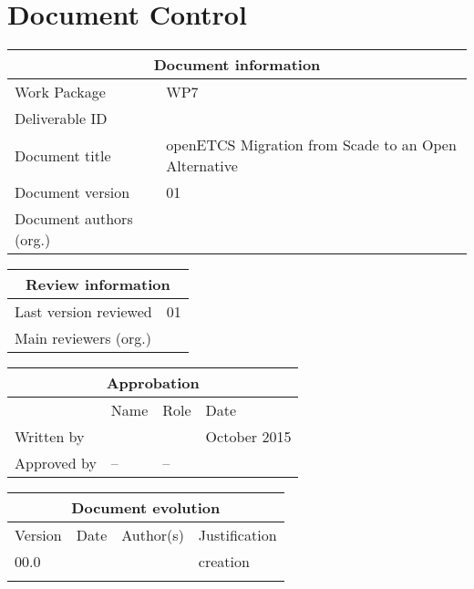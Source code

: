 \documentclass{template/openetcs_report}
\begin{document}
\maketitle
\tableofcontents
\newpage

\chapter{Document Control}

\begin{tabular}{|p{4.4cm}|p{8.7cm}|}
\hline
\multicolumn{2}{|c|}{Document information} \\
\hline
Work Package &  WP7  \\
Deliverable ID & \\
\hline
Document title & openETCS Migration from Scade to an Open Alternative \\
Document version & 01 \\
Document authors (org.)  & \\
\hline
\end{tabular}

\begin{tabular}{|p{4.4cm}|p{8.7cm}|}
\hline
\multicolumn{2}{|c|}{Review information} \\
\hline
Last version reviewed & 01 \\
\hline
Main reviewers (org.) &  \\
\hline
\end{tabular}

\begin{tabular}{|p{2.2cm}|p{4cm}|p{4cm}|p{2cm}|}
\hline
\multicolumn{4}{|c|}{Approbation} \\
\hline
  &  Name & Role & Date   \\
\hline  
Written by    &  &   &  October 2015\\
\hline
Approved by & -- & -- & \\
\hline
\end{tabular}

\begin{tabular}{|p{2.2cm}|p{2cm}|p{3cm}|p{5cm}|}
\hline
\multicolumn{4}{|c|}{Document evolution} \\
\hline
Version &  Date & Author(s) & Justification  \\
\hline
00.0 &  &  & creation \\
\hline  
 & &  &   \\
\hline  
\end{tabular}
\newpage
\end{document}
